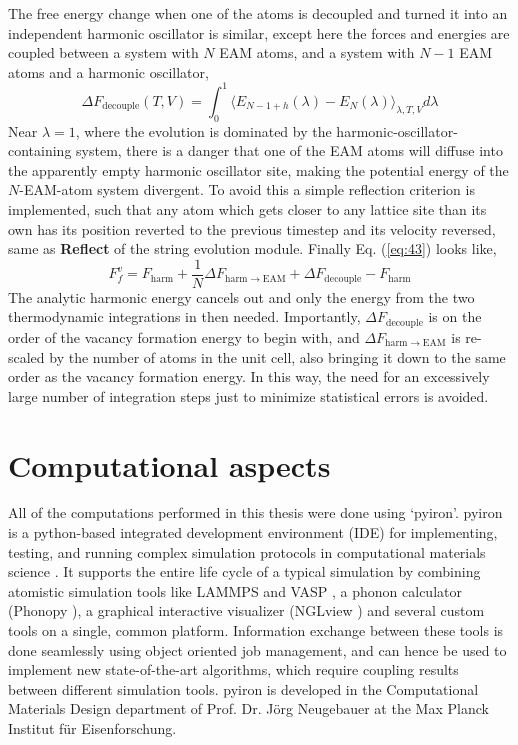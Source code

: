 \documentclass{article}
\begin{document}
The free energy change when one of the atoms is decoupled and turned it into an independent harmonic oscillator is similar, except here the forces and energies are coupled between a system with $N$ EAM atoms, and a system with $N-1$ EAM atoms and a harmonic oscillator,
%
\begin{equation} \label{eq:46}
\Delta F_\mathrm{decouple}(T, V) = \int_0^1 \langle E_{N-1+h}(\lambda) - E_N(\lambda) \rangle_{\lambda, T, V} d\lambda
\end{equation}
%
Near $\lambda=1$, where the evolution is dominated by the harmonic-oscillator-containing system, there is a danger that one of the EAM atoms will diffuse into the apparently empty harmonic oscillator site, making the potential energy of the $N$-EAM-atom system divergent. To avoid this a simple reflection criterion is implemented, such that any atom which gets closer to any lattice site than its own has its position reverted to the previous timestep and its velocity reversed, same as \textbf{Reflect} of the string evolution module. Finally Eq. (\ref{eq:43}) looks like,
%
\begin{equation} \label{eq:47}
F_f^v  = F_\mathrm{harm} + \frac{1}{N}\Delta F_\mathrm{harm \rightarrow EAM} + \Delta F_\mathrm{decouple} - F_\mathrm{harm}
\end{equation}
%
The analytic harmonic energy cancels out and only the energy from the two thermodynamic integrations in then needed. Importantly, $\Delta F_\mathrm{decouple}$ is on the order of the vacancy formation energy to begin with, and $\Delta F_\mathrm{harm \rightarrow EAM}$ is re-scaled by the number of atoms in the unit cell, also bringing it down to the same order as the vacancy formation energy. In this way, the need for an excessively large number of integration steps just to minimize statistical errors is avoided. \\

\newpage
\section{Computational aspects}\label{cas}

All of the computations performed in this thesis were done using \enquote*{pyiron}. pyiron is a python-based integrated development environment (IDE) for implementing, testing, and running complex simulation protocols in computational materials science \cite{Janssen2019}. It supports the entire life cycle of a typical simulation by combining atomistic simulation tools like LAMMPS \cite{Plimpton1995} and VASP \cite{Kresse1993, Kresse1996a, Kresse1996}, a phonon calculator (Phonopy \cite{Togo2015}), a graphical interactive visualizer (NGLview \cite{Nguyen2018}) and several custom tools on a single, common platform. Information exchange between these tools is done seamlessly using object oriented job management, and can hence be used to implement new state-of-the-art algorithms, which require coupling results between different simulation tools. pyiron is developed in the Computational Materials Design department of Prof. Dr. Jörg Neugebauer at the Max Planck Institut für Eisenforschung.
\end{document}
